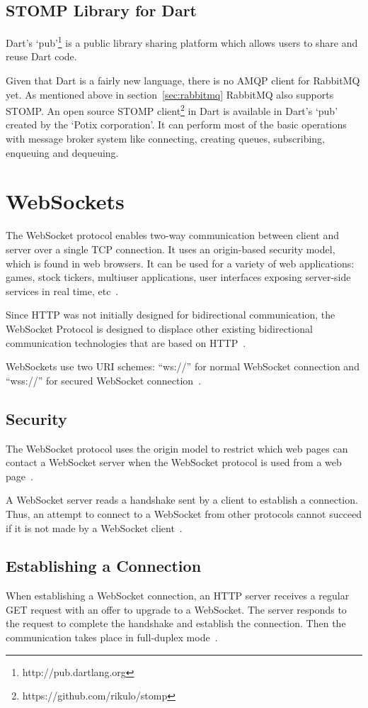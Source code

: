  \subsection{STOMP Library for Dart}
  \label{subsec:stompForDart}
  Dart's ‘pub’\footnote{http://pub.dartlang.org} is a public library sharing platform which allows users to share and reuse Dart code.

  Given that Dart is a fairly new language, there is no AMQP client for RabbitMQ yet. As mentioned above in section~\ref{sec:rabbitmq} RabbitMQ also supports STOMP. An open source STOMP client\footnote{https://github.com/rikulo/stomp} in Dart is available in Dart's ‘pub’ created by the ‘Potix corporation’. It can perform most of the basic operations with message broker system like connecting, creating queues, subscribing, enqueuing and dequeuing.


\section{WebSockets}
\label{sec:websocket}
  The WebSocket protocol enables two-way communication between client and server over a single TCP connection. It uses an origin-based security model, which is found in web browsers. It can be used for a variety of web applications: games, stock tickers, multiuser applications, user interfaces exposing server-side services in real time, etc~\cite{rfc6455}.

  Since HTTP was not initially designed for bidirectional communication, the WebSocket Protocol is designed to displace other existing bidirectional communication technologies that are based on HTTP~\cite{rfc6455}.

  WebSockets use two URI schemes: “ws://” for normal WebSocket connection and “wss://” for secured WebSocket connection~\cite{rfc6455}.

\subsection{Security}
  The WebSocket protocol uses the origin model to restrict which web pages can contact a WebSocket server when the WebSocket protocol is used from a web page~\cite{rfc6455}.

   A WebSocket server reads a handshake sent by a client to establish a connection. Thus, an attempt to connect to a WebSocket from other protocols cannot succeed if it is not made by a WebSocket client~\cite{rfc6455}.

\subsection{Establishing a Connection}
  When establishing a WebSocket connection, an HTTP server receives a regular GET request with an offer to upgrade to a WebSocket. The server responds to the request to complete the handshake and establish the connection. Then the communication takes place in full-duplex mode~\cite{rfc6455}.
